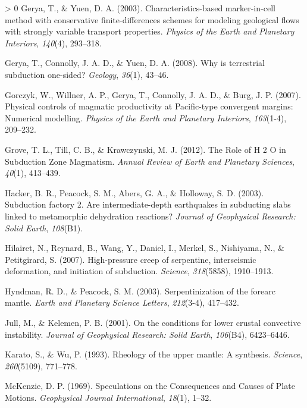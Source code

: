 \documentclass[draft,linenumbers]{agujournal2018}
\newlength{\cslhangindent}
\newenvironment{CSLReferences}[3] %
 {%
  \setlength{\parindent}{0pt}
  \ifodd #1 \everypar{\setlength{\hangindent}{\cslhangindent}}\ignorespaces\fi
  \ifnum #2 > 0
  \setlength{\parskip}{#2\baselineskip}
  \fi
 }%
 {}
\begin{document}
\begin{CSLReferences}{1}{0}
\leavevmode\hypertarget{ref-Gerya2003}{}%
Gerya, T., \& Yuen, D. A. (2003). {Characteristics-based marker-in-cell
method with conservative finite-differences schemes for modeling
geological flows with strongly variable transport properties}.
\emph{Physics of the Earth and Planetary Interiors}, \emph{140}(4),
293--318.

\leavevmode\hypertarget{ref-Gerya2008}{}%
Gerya, T., Connolly, J. A. D., \& Yuen, D. A. (2008). {Why is
terrestrial subduction one-sided?} \emph{Geology}, \emph{36}(1), 43--46.

\leavevmode\hypertarget{ref-Gorczyk2007}{}%
Gorczyk, W., Willner, A. P., Gerya, T., Connolly, J. A. D., \& Burg, J.
P. (2007). {Physical controls of magmatic productivity at Pacific-type
convergent margins: Numerical modelling}. \emph{Physics of the Earth and
Planetary Interiors}, \emph{163}(1-4), 209--232.

\leavevmode\hypertarget{ref-Grove2012}{}%
Grove, T. L., Till, C. B., \& Krawczynski, M. J. (2012). {The Role of H
2 O in Subduction Zone Magmatism}. \emph{Annual Review of Earth and
Planetary Sciences}, \emph{40}(1), 413--439.

\leavevmode\hypertarget{ref-Hacker2003}{}%
Hacker, B. R., Peacock, S. M., Abers, G. A., \& Holloway, S. D. (2003).
{Subduction factory 2. Are intermediate-depth earthquakes in subducting
slabs linked to metamorphic dehydration reactions?} \emph{Journal of
Geophysical Research: Solid Earth}, \emph{108}(B1).

\leavevmode\hypertarget{ref-Hilairet2007}{}%
Hilairet, N., Reynard, B., Wang, Y., Daniel, I., Merkel, S., Nishiyama,
N., \& Petitgirard, S. (2007). High-pressure creep of serpentine,
interseismic deformation, and initiation of subduction. \emph{Science},
\emph{318}(5858), 1910--1913.

\leavevmode\hypertarget{ref-Hyndman2003}{}%
Hyndman, R. D., \& Peacock, S. M. (2003). Serpentinization of the
forearc mantle. \emph{Earth and Planetary Science Letters},
\emph{212}(3-4), 417--432.

\leavevmode\hypertarget{ref-Jull2001}{}%
Jull, M., \& Kelemen, P. B. (2001). On the conditions for lower crustal
convective instability. \emph{Journal of Geophysical Research: Solid
Earth}, \emph{106}(B4), 6423--6446.

\leavevmode\hypertarget{ref-Karato1993}{}%
Karato, S., \& Wu, P. (1993). Rheology of the upper mantle: A synthesis.
\emph{Science}, \emph{260}(5109), 771--778.

\leavevmode\hypertarget{ref-McKenzie1969}{}%
McKenzie, D. P. (1969). {Speculations on the Consequences and Causes of
Plate Motions}. \emph{Geophysical Journal International}, \emph{18}(1),
1--32.


\end{CSLReferences}
\end{document}
